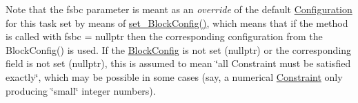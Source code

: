 Note that the fsbc parameter is meant as an {\itshape override} of the default \mbox{\hyperlink{class_s_m_spp__di__unipi__it_1_1_configuration}{Configuration}} for this task set by means of \mbox{\hyperlink{class_s_m_spp__di__unipi__it_1_1_block_a18d411b740a47db00d15083c5c7ef2ba}{set\+\_\+\+Block\+Config()}}, which means that if the method is called with fsbc = nullptr then the corresponding configuration from the Block\+Config() is used. If the \mbox{\hyperlink{class_s_m_spp__di__unipi__it_1_1_block_config}{Block\+Config}} is not set (nullptr) or the corresponding field is not set (nullptr), this is assumed to mean \char`\"{}all Constraint must be satisfied
exactly\char`\"{}, which may be possible in some cases (say, a numerical \mbox{\hyperlink{class_s_m_spp__di__unipi__it_1_1_constraint}{Constraint}} only producing \char`\"{}small\char`\"{} integer numbers).

